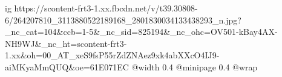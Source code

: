  
 
 
 
 

\ifcmt
  ig https://scontent-frt3-1.xx.fbcdn.net/v/t39.30808-6/264207810_3113880522189168_2801830034133438293_n.jpg?_nc_cat=104&ccb=1-5&_nc_sid=825194&_nc_ohc=OV501-kBay4AX-NH9WJ&_nc_ht=scontent-frt3-1.xx&oh=00_AT_xeS9fsP55rZdZNAez9xk4abXXcO4IJ9-aiMKyaMmQUQ&oe=61E071EC
  @width 0.4
  @minipage 0.4
  @wrap \parpic[r]
\fi
